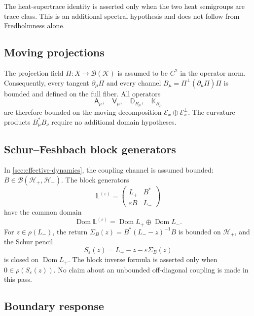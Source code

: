 \documentclass[11pt,reqno]{scrartcl}
\newcommand{\scrK}{\mathscr K}
\newcommand{\scrHp}{\mathscr H_{+}}
\newcommand{\scrHm}{\mathscr H_{-}}
\newcommand{\Aop}{\mathsf A}
\newcommand{\Vop}{\mathsf V}
\newcommand{\DB}{\mathbb D}
\newcommand{\KB}{\mathbb K}
\DeclareMathOperator{\Dom}{Dom}
\theoremstyle{plain}
\theoremstyle{definition}
\theoremstyle{remark}
\begin{document}
The heat-supertrace identity is asserted only when the two heat semigroups
are trace class. This is an additional spectral hypothesis and does not
follow from Fredholmness alone.

\subsection{Moving projections}

The projection field \(\Pi:X\to\mathcal B(\scrK)\) is assumed to be
\(C^2\) in the operator norm.  Consequently, every tangent
\(\partial_\mu\Pi\) and every channel
\(B_\mu=\Pi^\perp(\partial_\mu\Pi)\Pi\) is bounded and defined on the full
fiber.  All operators
\begin{equation}
  \Aop_\mu,\quad
  \Vop_\mu,\quad
  \DB_{B_\mu},\quad
  \KB_{B_\mu}
\end{equation}
are therefore bounded on the moving decomposition
\(\mathscr E_x\oplus\mathscr E_x^\perp\).  The curvature products
\(B_\mu^*B_\nu\) require no additional domain hypotheses.

\subsection{Schur--Feshbach block generators}

In \cref{sec:effective-dynamics}, the coupling channel is assumed bounded:
\(B\in\mathcal B(\scrHp,\scrHm)\).  The block generators
\begin{equation}
  \mathbb L^{(\varepsilon)}
  =\begin{pmatrix}L_+&B^*\\ \varepsilon B&L_-\end{pmatrix}
\end{equation}
have the common domain
\begin{equation}
  \Dom\mathbb L^{(\varepsilon)}
  =\Dom L_+\oplus\Dom L_-.
\end{equation}
For \(z\in\rho(L_-)\), the return
\(\Sigma_B(z)=B^*(L_--z)^{-1}B\) is bounded on \(\scrHp\), and the Schur
pencil
\begin{equation}
  S_\varepsilon(z)=L_+-z-\varepsilon\Sigma_B(z)
\end{equation}
is closed on \(\Dom L_+\).  The block inverse formula is asserted only when
\(0\in\rho(S_\varepsilon(z))\).  No claim about an unbounded off-diagonal
coupling is made in this pass.

\subsection{Boundary response}
\end{document}
